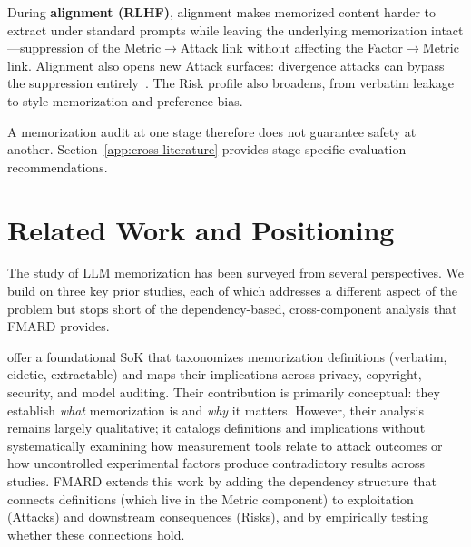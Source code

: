 \documentclass[11pt]{article}
\begin{document}
During \textbf{alignment (RLHF)}, alignment makes memorized content harder to
extract under standard prompts while leaving the underlying memorization
intact---suppression of the Metric$\to$Attack link without affecting the
Factor$\to$Metric link.
Alignment also opens new Attack surfaces: divergence attacks can bypass the
suppression entirely~\citep{nasr2023scalableextractiontrainingdata}.
The Risk profile also broadens, from verbatim leakage to style memorization
and preference bias.

A memorization audit at one stage therefore does not guarantee safety at
another.
Section~\ref{app:cross-literature} provides stage-specific evaluation
recommendations.


\section{Related Work and Positioning}
\label{app:related}

The study of LLM memorization has been surveyed from several perspectives.
We build on three key prior studies, each of which addresses a different
aspect of the problem but stops short of the dependency-based, cross-component
analysis that FMARD provides.

\textbf{\citet{hartmann2023sok}} offer a foundational SoK that taxonomizes
memorization definitions (verbatim, eidetic, extractable) and maps their
implications across privacy, copyright, security, and model auditing.
Their contribution is primarily conceptual: they establish \textit{what}
memorization is and \textit{why} it matters.
However, their analysis remains largely qualitative; it catalogs definitions
and implications without systematically examining how measurement tools relate
to attack outcomes or how uncontrolled experimental factors produce
contradictory results across studies.
FMARD extends this work by adding the dependency structure that connects
definitions (which live in the Metric component) to exploitation (Attacks) and
downstream consequences (Risks), and by empirically testing whether these
connections hold.
\end{document}
